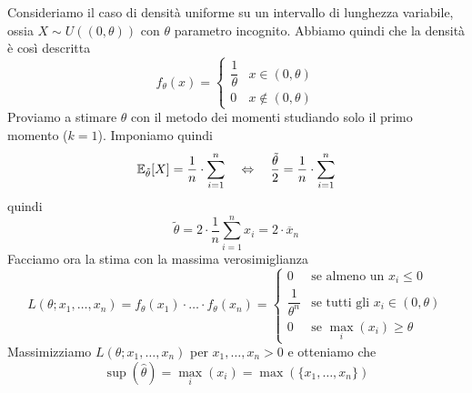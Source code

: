 \begin{example}
	Consideriamo il caso di densità uniforme su un intervallo di lunghezza variabile, ossia
	$X \sim U((0, \theta))$ con $\theta$ parametro incognito. Abbiamo quindi che la densità è così
	descritta
	\[
		f_\theta(x) = \begin{cases}
			\dfrac{1}{\theta} & x \in (0, \theta)    \\[2ex]
			0                 & x \notin (0, \theta)
		\end{cases}
	\]
	Proviamo a stimare $\theta$ con il metodo dei momenti studiando solo il primo momento ($k=1$).
	Imponiamo quindi
	\[
		\mathbb{E}_{\tilde{\theta}}[X] = \frac{1}{n} \cdot \sum_{i=1}^n
		\quad \Leftrightarrow \quad
		\frac{\tilde{\theta}}{2} = \frac{1}{n} \cdot \sum_{i=1}^n
	\]
	quindi
	\[ \tilde{\theta} = 2 \cdot \frac{1}{n} \sum_{i=1}^n x_i = 2 \cdot \overline{x}_n \]
	Facciamo ora la stima con la massima verosimiglianza
	\[
		L(\theta; x_1, \dots, x_n) = f_\theta (x_1) \cdot \ldots \cdot f_\theta (x_n) =
		\begin{cases}
			0                   & \text{se almeno un } x_i \leq 0          \\[1ex]
			\dfrac{1}{\theta^n} & \text{se tutti gli } x_i \in (0, \theta) \\[1ex]
			0                   & \text{se } \max_i (x_i) \geq \theta
		\end{cases}
	\]
	Massimizziamo $L(\theta; x_1, \dots, x_n)$ per $x_1, \dots, x_n > 0$ e otteniamo che
	\[ \sup (\hat{\theta}) = \max_i (x_i) = \max (\{x_1, \dots, x_n\}) \]
\end{example}